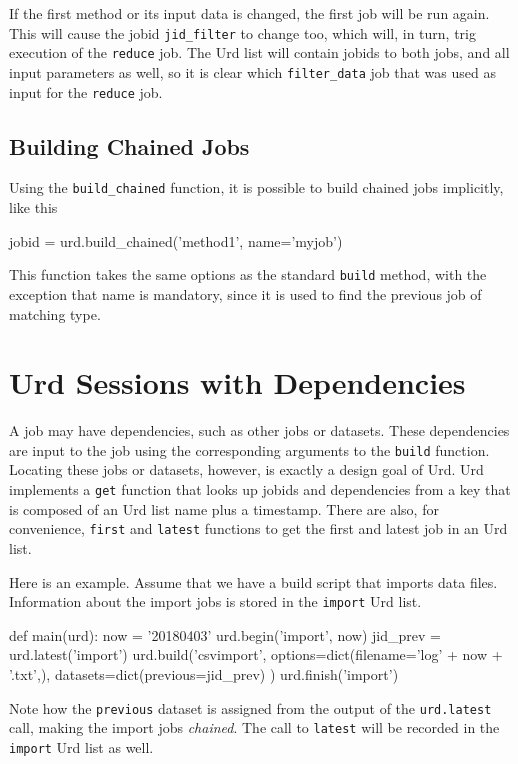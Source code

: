 If the first method or its input data is changed, the first job will
be run again.  This will cause the jobid \texttt{jid\_filter} to
change too, which will, in turn, trig execution of the \texttt{reduce}
job.  The Urd list will contain jobids to both jobs, and all input
parameters as well, so it is clear which \texttt{filter\_data} job
that was used as input for the \texttt{reduce} job.



\subsection{Building Chained Jobs}

Using the \texttt{build\_chained} function, it is possible to build
chained jobs implicitly, like this
\begin{python}
jobid = urd.build_chained('method1', name='myjob')
\end{python}
This function takes the same options as the standard \texttt{build}
method, with the exception that name is mandatory, since it is used to
find the previous job of matching type.






\section{Urd Sessions with Dependencies}



A job may have dependencies, such as other jobs or datasets.  These
dependencies are input to the job using the corresponding arguments to
the \texttt{build} function.  Locating these jobs or datasets,
however, is exactly a design goal of Urd.  Urd implements a
\texttt{get} function that looks up jobids and dependencies from a key
that is composed of an Urd list name plus a timestamp.  There are
also, for convenience, \texttt{first} and \texttt{latest} functions to
get the first and latest job in an Urd list.

Here is an example.  Assume that we have a build script that imports
data files.  Information about the import jobs is stored in the
\texttt{import} Urd list.
\begin{python}
def main(urd):
    now = '20180403'
    urd.begin('import', now)
    jid_prev = urd.latest('import')
    urd.build('csvimport',
        options=dict(filename='log' + now + '.txt',),
        datasets=dict(previous=jid_prev)
    )
    urd.finish('import')
\end{python}
Note how the \texttt{previous} dataset is assigned from the output of
the \texttt{urd.latest} call, making the import jobs \textsl{chained}.
The call to \texttt{latest} will be recorded in the \texttt{import}
Urd list as well.

